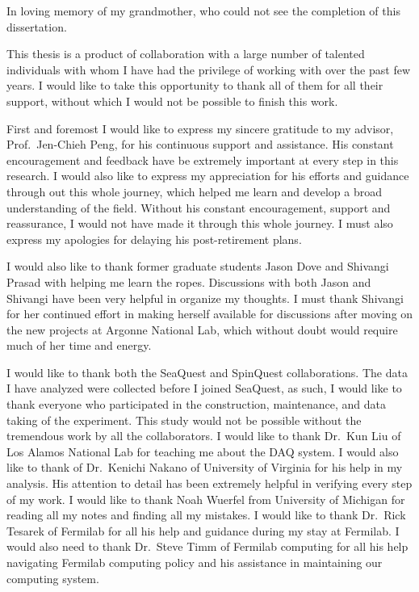 \documentclass[../main.tex]{subfiles}
\begin{document}
\begin{dedication}
	In loving memory of my grandmother, who could not see the completion of this dissertation.
\end{dedication}

\begin{acknowledgments}
	This thesis is a product of collaboration with a large number of talented
	individuals with whom I have had the privilege of working with over the past
	few years. I would like to take this opportunity to thank all of them for all
	their support, without which I would not be possible to finish this work.

	First and foremost I would like to express my sincere gratitude to my advisor, Prof.~Jen-Chieh Peng, for
	his continuous support and assistance. His constant encouragement and feedback
	have be extremely important at every step in this research.
	I would also like to express my	appreciation for his efforts and guidance
	through out this whole journey, which helped me learn and develop a broad
	understanding of the field.
	Without his constant encouragement, support
	and reassurance, I would not have made it through this whole journey.
	I must also express my apologies for delaying his post-retirement plans.

	I would also like to thank former graduate students Jason Dove and Shivangi
	Prasad with helping me learn the ropes. Discussions with both Jason and
	Shivangi have been very helpful in organize my thoughts.
	I must thank Shivangi for her continued effort in making herself available for
	discussions after moving on the new projects at Argonne National Lab, which
	without doubt would require much of her time and energy.

	I would like to thank both the SeaQuest and SpinQuest collaborations.
	The data I have analyzed were collected before I joined SeaQuest, as such,
	I would like to thank everyone who participated in the construction, maintenance,
	and data taking of the experiment.
	This study would not be possible without the tremendous work by all the collaborators.
	I would like to thank Dr.~Kun Liu of Los Alamos National Lab for teaching me about the DAQ system.
	I would also like to thank of Dr.~Kenichi Nakano of University of Virginia for his help in my analysis.
	His attention to detail has been extremely helpful in verifying every step
	of my work.
	I would like to thank Noah Wuerfel from University of Michigan for reading all
	my notes and finding all my mistakes.
	I would like to thank Dr.~Rick Tesarek of Fermilab for all his help and guidance during my
	stay at Fermilab.
	I would also need to thank Dr.~Steve Timm of Fermilab computing for all his help navigating Fermilab
	computing policy and his assistance in maintaining our computing system.


\end{acknowledgments}
\end{document}
